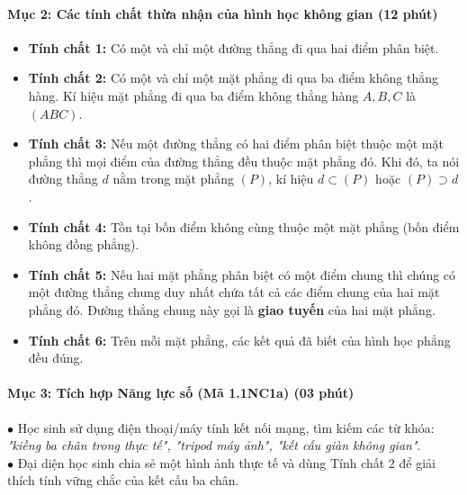 \documentclass[12pt, a4paper]{article}
\begin{document}
\paragraph{Mục 2: Các tính chất thừa nhận của hình học không gian (12 phút)}
\begin{itemize}
    \item \textbf{Tính chất 1:} Có một và chỉ một đường thẳng đi qua hai điểm phân biệt.
    \item \textbf{Tính chất 2:} Có một và chỉ một mặt phẳng đi qua ba điểm không thẳng hàng. Kí hiệu mặt phẳng đi qua ba điểm không thẳng hàng $A, B, C$ là $(ABC)$.
    \item \textbf{Tính chất 3:} Nếu một đường thẳng có hai điểm phân biệt thuộc một mặt phẳng thì mọi điểm của đường thẳng đều thuộc mặt phẳng đó.
    Khi đó, ta nói đường thẳng $d$ nằm trong mặt phẳng $(P)$, kí hiệu $d \subset (P)$ hoặc $(P) \supset d$.
    \item \textbf{Tính chất 4:} Tồn tại bốn điểm không cùng thuộc một mặt phẳng (bốn điểm không đồng phẳng).
    \item \textbf{Tính chất 5:} Nếu hai mặt phẳng phân biệt có một điểm chung thì chúng có một đường thẳng chung duy nhất chứa tất cả các điểm chung của hai mặt phẳng đó. Đường thẳng chung này gọi là \textbf{giao tuyến} của hai mặt phẳng.
    \item \textbf{Tính chất 6:} Trên mỗi mặt phẳng, các kết quả đã biết của hình học phẳng đều đúng.
\end{itemize}

\paragraph{Mục 3: Tích hợp Năng lực số (Mã 1.1NC1a) (03 phút)}

\begin{pedabox}
    $\bullet$ Học sinh sử dụng điện thoại/máy tính kết nối mạng, tìm kiếm các từ khóa: \textit{"kiềng ba chân trong thực tế", "tripod máy ảnh", "kết cấu giàn không gian"}.\\
    $\bullet$ Đại diện học sinh chia sẻ một hình ảnh thực tế và dùng Tính chất 2 để giải thích tính vững chắc của kết cấu ba chân.
\end{pedabox}
\end{document}
